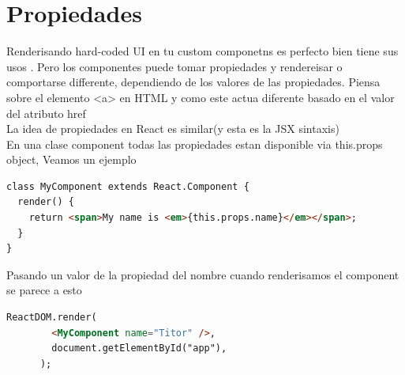 \section{Propiedades}
Renderisando hard-coded UI en tu custom componetns es perfecto bien tiene sus usos . Pero los componentes puede tomar propiedades y rendereisar o comportarse differente, dependiendo de los valores de las propiedades. Piensa sobre el elemento <a> en HTML y como este actua diferente basado en el valor del atributo href\\
La idea de propiedades en React es similar(y esta es la JSX sintaxis)\\
En una clase component todas las propiedades estan disponible via this.props object, Veamos un ejemplo
\begin{lstlisting}[language=html]
class MyComponent extends React.Component {
  render() {
    return <span>My name is <em>{this.props.name}</em></span>;
  }
}
\end{lstlisting}
Pasando un valor de la propiedad del nombre cuando renderisamos el component se parece a esto
\begin{lstlisting}[language=html]
      ReactDOM.render(
        <MyComponent name="Titor" />,
        document.getElementById("app"),
      );
\end{lstlisting}
